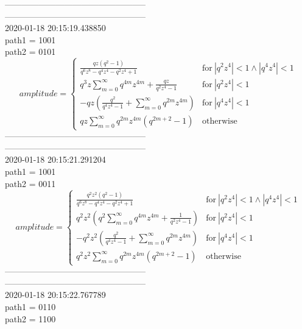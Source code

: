 --------------------------------------------------\\
--------------------------------------------------\\
2020-01-18 20:15:19.438850\\
path1 = 1001\\
path2 = 0101\\
$$amplitude = \begin{cases} \frac{q z \left(q^{2} - 1\right)}{q^{6} z^{8} - q^{4} z^{4} - q^{2} z^{4} + 1} & \text{for}\: \left|{q^{2} z^{4}}\right| < 1 \wedge \left|{q^{4} z^{4}}\right| < 1 \\q^{3} z \sum_{m=0}^{\infty} q^{4 m} z^{4 m} + \frac{q z}{q^{2} z^{4} - 1} & \text{for}\: \left|{q^{2} z^{4}}\right| < 1 \\- q z \left(\frac{q^{2}}{q^{4} z^{4} - 1} + \sum_{m=0}^{\infty} q^{2 m} z^{4 m}\right) & \text{for}\: \left|{q^{4} z^{4}}\right| < 1 \\q z \sum_{m=0}^{\infty} q^{2 m} z^{4 m} \left(q^{2 m + 2} - 1\right) & \text{otherwise} \end{cases}$$
--------------------------------------------------\\
--------------------------------------------------\\
2020-01-18 20:15:21.291204\\
path1 = 1001\\
path2 = 0011\\
$$amplitude = \begin{cases} \frac{q^{2} z^{2} \left(q^{2} - 1\right)}{q^{6} z^{8} - q^{4} z^{4} - q^{2} z^{4} + 1} & \text{for}\: \left|{q^{2} z^{4}}\right| < 1 \wedge \left|{q^{4} z^{4}}\right| < 1 \\q^{2} z^{2} \left(q^{2} \sum_{m=0}^{\infty} q^{4 m} z^{4 m} + \frac{1}{q^{2} z^{4} - 1}\right) & \text{for}\: \left|{q^{2} z^{4}}\right| < 1 \\- q^{2} z^{2} \left(\frac{q^{2}}{q^{4} z^{4} - 1} + \sum_{m=0}^{\infty} q^{2 m} z^{4 m}\right) & \text{for}\: \left|{q^{4} z^{4}}\right| < 1 \\q^{2} z^{2} \sum_{m=0}^{\infty} q^{2 m} z^{4 m} \left(q^{2 m + 2} - 1\right) & \text{otherwise} \end{cases}$$
--------------------------------------------------\\
--------------------------------------------------\\
2020-01-18 20:15:22.767789\\
path1 = 0110\\
path2 = 1100\\
